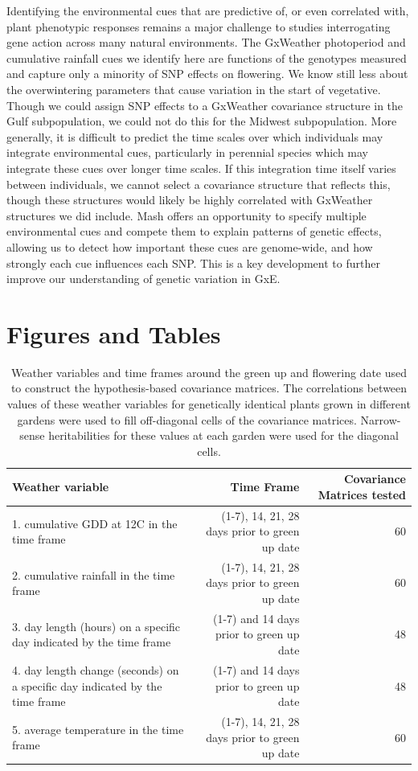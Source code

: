 \documentclass[
  9pt,
  twocolumn,
  twoside]{pnas-new}
\begin{document}
Identifying the environmental cues that are predictive of, or even
correlated with, plant phenotypic responses remains a major challenge to
studies interrogating gene action across many natural environments. The
GxWeather photoperiod and cumulative rainfall cues we identify here are
functions of the genotypes measured and capture only a minority of SNP
effects on flowering. We know still less about the overwintering
parameters that cause variation in the start of vegetative. Though we
could assign SNP effects to a GxWeather covariance structure in the Gulf
subpopulation, we could not do this for the Midwest subpopulation. More
generally, it is difficult to predict the time scales over which
individuals may integrate environmental cues, particularly in perennial
species which may integrate these cues over longer time scales. If this
integration time itself varies between individuals, we cannot select a
covariance structure that reflects this, though these structures would
likely be highly correlated with GxWeather structures we did include.
Mash offers an opportunity to specify multiple environmental cues and
compete them to explain patterns of genetic effects, allowing us to
detect how important these cues are genome-wide, and how strongly each
cue influences each SNP. This is a key development to further improve
our understanding of genetic variation in GxE.

\section{Figures and Tables}\label{figures-and-tables}

\begin{table}[t!]
\centering
\caption{Weather variables and time frames around the green up and flowering date used to construct the hypothesis-based covariance matrices. The correlations between values of these weather variables for genetically identical plants grown in different gardens were used to fill off-diagonal cells of the covariance matrices. Narrow-sense heritabilities for these values at each garden were used for the diagonal cells.}
\begin{tabular}{lrr}
Weather variable & Time Frame & Covariance Matrices tested \\
\midrule
1. cumulative GDD at 12C in the time frame & (1-7), 14, 21, 28 days prior to green up date & 60 \\
2. cumulative rainfall in the time frame & (1-7), 14, 21, 28 days prior to green up date & 60  \\
3. day length (hours) on a specific day indicated by the time frame & (1-7) and 14 days prior to green up date & 48 \\
4. day length change (seconds) on a specific day indicated by the time frame & (1-7) and 14 days prior to green up date & 48 \\
5. average temperature in the time frame & (1-7), 14, 21, 28 days prior to green up date & 60 \\
\bottomrule
\end{tabular}

\end{table}
\end{document}
